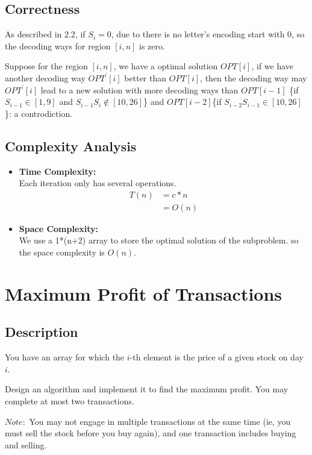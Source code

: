 \documentclass[UTF8,a4paper,12pt]{article}
\begin{document}
\begin{CJK}{UTF8}{gkai}
	\subsection{Correctness}
		As described in $ 2.2 $, if $ S_{i} = 0 $, due to there is no letter's encoding start with 0, so the decoding ways for region $ [i,n] $ is zero. 
	
		Suppose for the region $ [i,n] $, we have a optimal solution $ OPT[i] $, if we have another decoding way $ OPT^{'}[i] $ better than $ OPT[i] $, then the decoding way may $ OPT^{'}[i] $ lead to a new solution with more decoding ways than $ OPT[i-1] $ \{if $ S_{i-1} \in [1,9]$ and $ S_{i-1}S_{i} \notin [10,26] $\} and $ OPT[i-2] $\{if $ S_{i-2}S_{i-1}\in[10,26] $\}: a controdiction.
	
	\subsection{Complexity Analysis}
	\begin{itemize}
		\item{\textbf{Time Complexity:}} \\
			Each iteration only has several operations.
			\begin{align*}
			T(n) &= c*n\\
			&=O(n)
			\end{align*}
		\item{\textbf{Space Complexity:}}\\
			We use a 1*(n+2) array to store the optimal solution of the subproblem. so the space complexity is $ O(n) $.
		
	\end{itemize}
	
	
	
	
	
	
	
	\newpage
	\section{Maximum Profit of Transactions}
	\subsection{Description}
		You have an array for which the $ i $-th element is the price of a given stock on day $ i $.
		
		Design an algorithm and implement it to find the maximum profit. You may complete at most two transactions.
		
		$ Note: $ You may not engage in multiple transactions at the same time (ie, you must sell the stock before you buy again), and one transaction includes buying and selling.
	

\end{CJK}
\end{document}

